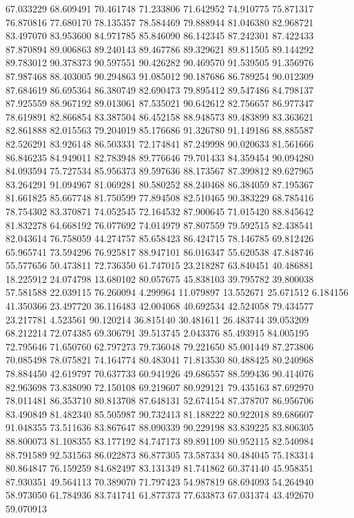 67.033229
68.609491
70.461748
71.233806
71.642952
74.910775
75.871317
76.870816
77.680170
78.135357
78.584469
79.888944
81.046380
82.968721
83.497070
83.953600
84.971785
85.846090
86.142345
87.242301
87.422433
87.870894
89.006863
89.240143
89.467786
89.329621
89.811505
89.144292
89.783012
90.378373
90.597551
90.426282
90.469570
91.539505
91.356976
87.987468
88.403005
90.294863
91.085012
90.187686
86.789254
90.012309
87.684619
86.695364
86.380749
82.690473
79.895412
89.547486
84.798137
87.925559
88.967192
89.013061
87.535021
90.642612
82.756657
86.977347
78.619891
82.866854
83.387504
86.452158
88.948573
89.483899
83.363621
82.861888
82.015563
79.204019
85.176686
91.326780
91.149186
88.885587
82.526291
83.926148
86.503331
72.174841
87.249998
90.020633
81.561666
86.846235
84.949011
82.783948
89.776646
79.701433
84.359454
90.094280
84.093594
75.727534
85.956373
89.597636
88.173567
87.399812
89.627965
83.264291
91.094967
81.069281
80.580252
88.240468
86.384059
87.195367
81.661825
85.667748
81.750599
77.894508
82.510465
90.383229
68.785416
78.754302
83.370871
74.052545
72.164532
87.900645
71.015420
88.845642
81.832278
64.668192
76.077692
74.014979
87.807559
79.592515
82.438541
82.043614
76.758059
44.274757
85.658423
86.424715
78.146785
69.812426
65.965741
73.594296
76.925817
88.947101
86.016347
55.620538
47.848746
55.577656
50.473811
72.736350
61.747015
23.218287
63.840451
40.486881
18.225912
24.074798
13.680102
80.057675
45.838103
39.795782
39.800038
57.581588
22.039115
76.260094
4.299964
11.079897
13.552671
25.671512
6.184156
41.350366
23.497720
36.116483
42.004068
40.692534
42.524058
79.434577
23.217781
4.523561
90.120214
36.815140
30.481611
26.483744
39.053209
68.212214
72.074385
69.306791
39.513745
2.043376
85.493915
84.005195
72.795646
71.650760
62.797273
79.736048
79.221650
85.001449
87.273806
70.085498
78.075821
74.164774
80.483041
71.813530
80.488425
80.240968
78.884450
42.619797
70.637733
60.941926
49.686557
88.599436
90.414076
82.963698
73.838090
72.150108
69.219607
80.929121
79.435163
87.692970
78.011481
86.353710
80.813708
87.648131
52.674154
87.378707
86.956706
83.490849
81.482340
85.505987
90.732413
81.188222
80.922018
89.686607
91.048355
73.511636
83.867647
88.090339
90.229198
83.839225
83.806305
88.800073
81.108355
83.177192
84.747173
89.891109
80.952115
82.540984
88.791589
92.531563
86.022873
86.877305
73.587334
80.484045
75.183314
80.864847
76.159259
84.682497
83.131349
81.741862
60.374140
45.958351
87.930351
49.564113
70.389070
71.797423
54.987819
68.694093
54.264940
58.973050
61.784936
83.741741
61.877373
77.633873
67.031374
43.492670
59.070913
